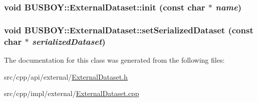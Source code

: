 \hypertarget{classBUSBOY_1_1ExternalDataset_afd6a0915ac381e9f0718c02bdab4295c}{
\subsubsection[{init}]{\setlength{\rightskip}{0pt plus 5cm}void BUSBOY::ExternalDataset::init (const char $\ast$ {\em name})}}
\label{classBUSBOY_1_1ExternalDataset_afd6a0915ac381e9f0718c02bdab4295c}
\hypertarget{classBUSBOY_1_1ExternalDataset_ae665e4a6d9308cd1637645e57ab5fa79}{
\subsubsection[{setSerializedDataset}]{\setlength{\rightskip}{0pt plus 5cm}void BUSBOY::ExternalDataset::setSerializedDataset (const char $\ast$ {\em serializedDataset})}}
\label{classBUSBOY_1_1ExternalDataset_ae665e4a6d9308cd1637645e57ab5fa79}


The documentation for this class was generated from the following files:\begin{DoxyCompactItemize}
\item 
src/cpp/api/external/\hyperlink{ExternalDataset_8h}{ExternalDataset.h}\item 
src/cpp/impl/external/\hyperlink{ExternalDataset_8cpp}{ExternalDataset.cpp}\end{DoxyCompactItemize}

